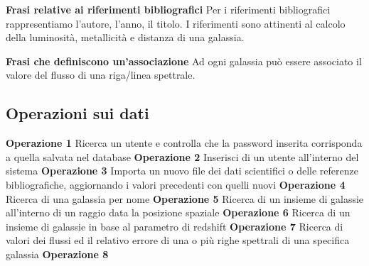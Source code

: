 \documentclass[12pt,a4paper,onecolumn]{article}
\begin{document}
	\begin{framed}
		\begin{flushleft}
			\textbf{Frasi relative ai riferimenti bibliografici}\newline
			Per i riferimenti bibliografici rappresentiamo l’autore, l’anno, il titolo. I riferimenti sono attinenti al calcolo della luminosità, metallicità e distanza di una galassia.
		\end{flushleft}
	\end{framed}
	
	\begin{framed}
		\begin{flushleft}
			\textbf{Frasi che definiscono un'associazione}
			Ad ogni galassia può essere associato il valore del flusso di una riga/linea spettrale.
		\end{flushleft}
	\end{framed}
	
	\subsection{Operazioni sui dati}
		\begin{flushleft}
			\textbf{Operazione 1} Ricerca un utente e controlla che la password inserita corrisponda a quella salvata nel database\newline\newline
			\textbf{Operazione 2} Inserisci di un utente all'interno del sistema\newline\newline
			\textbf{Operazione 3} Importa un nuovo file dei dati scientifici o delle referenze bibliografiche, aggiornando i valori precedenti con quelli nuovi\newline\newline
			\textbf{Operazione 4} Ricerca di una galassia per nome\newline\newline
			\textbf{Operazione 5} Ricerca di un insieme di galassie all'interno di un raggio data la posizione spaziale\newline\newline
			\textbf{Operazione 6} Ricerca di un insieme di galassie in base al parametro di redshift\newline\newline
			\textbf{Operazione 7} Ricerca di valori dei flussi ed il relativo errore di una o più righe spettrali di una specifica galassia\newline\newline
			\textbf{Operazione 8}
		\end{flushleft}
	
\end{document}
